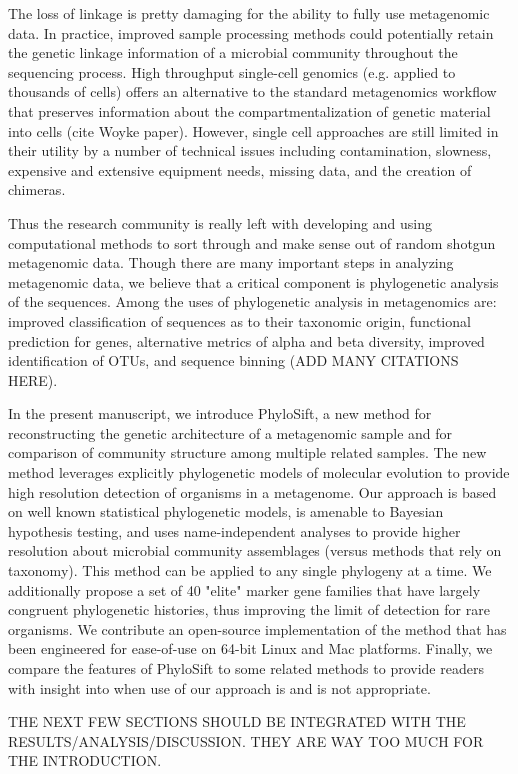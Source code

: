 \documentclass[10pt]{article}
\begin{document}
The loss of linkage is pretty damaging for the ability to fully use metagenomic data. In practice, improved sample processing methods could potentially retain the genetic linkage information of a microbial community throughout the sequencing process. High throughput single-cell genomics (e.g. applied to thousands of cells) offers an alternative to the standard metagenomics workflow that preserves information about the compartmentalization of genetic material into cells (cite Woyke paper).  However, single cell approaches are still limited in their utility by a number of technical issues including contamination, slowness, expensive and extensive equipment needs, missing data, and the creation of chimeras.  

Thus the research community is really left with developing and using computational methods to sort through and make sense out of random shotgun metagenomic data.  Though there are many important steps in analyzing metagenomic data, we believe that a critical component is phylogenetic analysis of the sequences.  Among the uses of phylogenetic analysis in metagenomics are: improved classification of sequences as to their taxonomic origin, functional prediction for genes, alternative metrics of alpha and beta diversity, improved identification of OTUs, and sequence binning (ADD MANY CITATIONS HERE).  

In the present manuscript, we introduce PhyloSift, a new method for reconstructing the genetic architecture of a metagenomic sample and for comparison of community structure among multiple related samples.
The new method leverages explicitly phylogenetic models of molecular evolution to provide high resolution detection of organisms in a metagenome. 
Our approach is based on well known statistical phylogenetic models, is amenable to Bayesian hypothesis testing, and uses name-independent analyses to provide higher resolution about microbial community assemblages (versus methods that rely on taxonomy). This method can be applied to any single phylogeny at a time. We additionally propose a set of 40 "elite" marker gene families that have largely congruent phylogenetic histories, thus improving the limit of detection for rare organisms. We contribute an open-source implementation of the method that has been engineered for ease-of-use on 64-bit Linux and Mac platforms. Finally, we compare the features of PhyloSift to some related methods to provide readers with insight into when use of our approach is and is not appropriate.

THE NEXT FEW SECTIONS SHOULD BE INTEGRATED WITH THE RESULTS/ANALYSIS/DISCUSSION.  THEY ARE WAY TOO MUCH FOR THE INTRODUCTION. 
\end{document}
